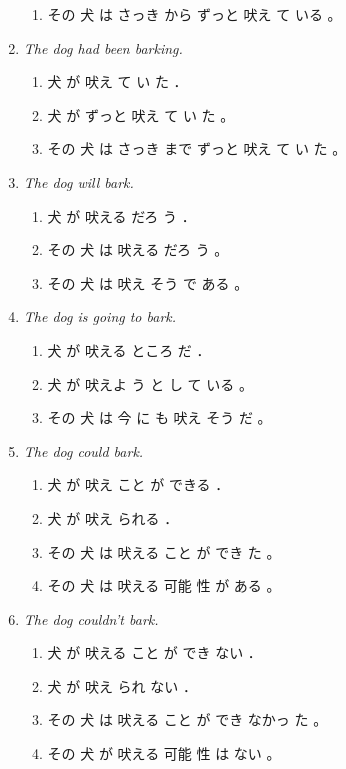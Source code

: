 \documentclass[a4paper,landscape,headrule,footrule,dvips]{foils}
\begin{document}
\begin{CJK}{UTF8}{min}
\begin{enumerate}
\begin{enumerate}
  \item その 犬 は さっき から ずっと 吠え て いる 。 
  \end{enumerate}
\item \textit{The dog had been barking.}
  \begin{enumerate}
  \item 犬 が 吠え て い た ．
  \item 犬 が ずっと 吠え て い た 。
  \item その 犬 は さっき まで ずっと 吠え て い た 。 
  \end{enumerate}
\item \textit{The dog will bark.}
  \begin{enumerate}
  \item 犬 が 吠える だろ う ．
  \item その 犬 は 吠える だろ う 。
  \item その 犬 は 吠え そう で ある 。
  \end{enumerate}
\item \textit{The dog is going to bark.}
  \begin{enumerate}
  \item 犬 が 吠える ところ だ ．
  \item 犬 が 吠えよ う と し て いる 。
  \item その 犬 は 今 に も 吠え そう だ 。 
  \end{enumerate}
\newpage
\item \textit{The dog could bark.}
  \begin{enumerate}
  \item 犬 が 吠え こと が できる ．
  \item 犬 が 吠え られる ．
  \item その 犬 は 吠える こと が でき た 。
  \item その 犬 は 吠える 可能 性 が ある 。 
  \end{enumerate}
\item \textit{The dog couldn't bark.}
  \begin{enumerate}
  \item 犬 が 吠える こと が でき ない ．
  \item 犬 が 吠え られ ない ．
  \item その 犬 は 吠える こと が でき なかっ た 。
  \item その 犬 が 吠える 可能 性 は ない 。 
  \end{enumerate}
\end{enumerate}





\end{CJK}
\end{document}
